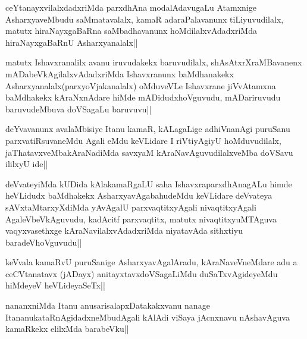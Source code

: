 
\begin{artha}
ceYtanayxvilalxdadxriMda parxdhAna modalAdavugaLu Atamxnige AsharxyaveMbudu saMmatavalalx, kamaR adaraPalavanunx tiLiyuvudilalx, matutx hiraNayxgaBaRna saMbadhavanunx hoMdilalxvAdadxriMda hiraNayxgaBaRnU Asharxyanalalx||
\end{artha}


\begin{artha}
matutx Ishavxranalilx avanu iruvudakekx baruvudilalx, shAsAtxrXraMBavanenx mADabeVkAgilalxvAdadxriMda Ishavxranunx baMdhanakekx Asharxyanalalx(parxyoVjakanalalx) oMduveVLe Ishavxrane jiVvAtamxna baMdhakekx kAraNxnAdare hiMde mADidudxhoVguvudu, mADariruvudu baruvudeMbuva doVSagaLu baruvuvu||
\end{artha}


\begin{artha}
deYvavanunx avalaMbisiye Itanu kamaR, kALagaLige adhiVnanAgi puruSanu parxvatiRsuvaneMdu Agali eMdu keVLidare I riVtiyAgiyU hoMduvudilalx, jaThatavxveMbakAraNadiMda savxyaM kAraNavAguvudilalxveMba doVSavu ililxyU ide||
\end{artha}


\begin{artha}
deVvateyiMda kUDida kAlakamaRgaLU saha IshavxraparxdhAnagALu himde heVLidudx baMdhakekx AsharxyavAgabahudeMdu keVLidare deVvateya sAVxtaMtarxyXdiMda yAvAgalU parxvaqtitxyAgali nivaqtitxyAgali AgaleVbeVkAguvudu, kadAcitf parxvaqtitx, matutx nivaqtitxyuMTAguva vaqyxvasethxge kAraNavilalxvAdadxriMda niyatavAda sithxtiyu baradeVhoVguvudu||
\end{artha}


\begin{artha}
keVvala kamaRvU puruSanige AsharxyavAgalAradu, kAraNaveVneMdare adu a ceCVtanatavx (jADayx) anitayxtavxdoVSagaLiMdu duSaTxvAgideyeMdu hiMdeyeV heVLideyaSeTx||
\end{artha}

\begin{artha}
nananxniMda Itanu anusarisalapxDatakakxvanu nanage ItananukataRnAgidadxneMbudAgali kAlAdi viSaya jAcnxnavu nAshavAguva kamaRkekx elilxMda barabeVku||
\end{artha}

